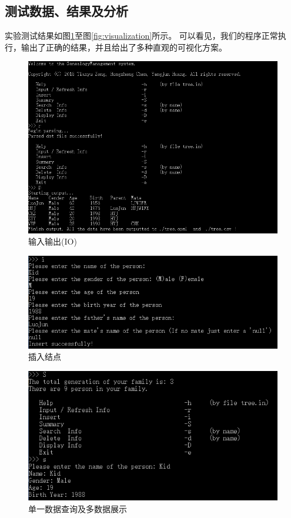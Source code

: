\documentclass[12pt,UTF8]{ctexart}
\begin{document}
\begin{spacing}{1.4}
\section{测试数据、结果及分析}
实验测试结果如图\ref{fig:io}至图\ref{fig:visualization}所示。
可以看见，我们的程序正常执行，输出了正确的结果，并且给出了多种直观的可视化方案。
\begin{figure}[htbp]
\centering
\includegraphics[width=0.9\linewidth]{fig/IO.PNG}
\caption{输入输出(IO)}
\label{fig:io}
\end{figure}
\begin{figure}[htbp]
\centering
\includegraphics[width=0.6\linewidth]{fig/insert.PNG}
\caption{插入结点}
\label{fig:insert}
\end{figure}
\begin{figure}[htbp]
\centering
\includegraphics[width=0.6\linewidth]{fig/show_and_search.PNG}
\caption{单一数据查询及多数据展示}
\label{fig:show}
\end{figure}
\begin{figure}[htbp]

\end{figure}
\end{spacing}
\end{document}
